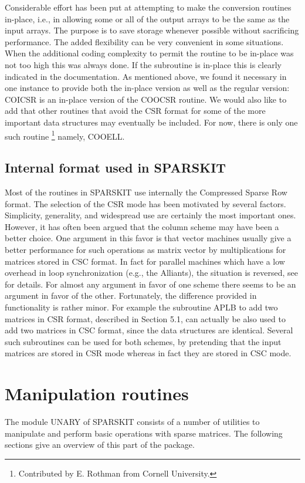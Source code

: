 \documentclass[12pt]{article}
\begin{document}
Considerable effort has been put at attempting to make the conversion
routines in-place, i.e., in allowing some or all of 
the output arrays to be the same as the input arrays. 
The purpose is to save storage whenever possible without
sacrificing performance. The added flexibility can be 
very convenient in some situations. 
When the additional coding complexity to  permit
the routine to be in-place was not too high this was always done.
If the subroutine is in-place this is clearly indicated in the
documentation. As mentioned above, we found it necessary in one instance
to provide both the in-place version as well as the regular version:
 COICSR is an in-place version of the COOCSR routine.
We would also like to add that other routines that avoid the
CSR format for some of the more important data structures may
eventually be included. For now, there is only one such routine
\footnote{Contributed by E. Rothman from Cornell University.}
namely, COOELL. 

\subsection{Internal format used in SPARSKIT}
Most of the routines in SPARSKIT  use internally the Compressed
Sparse Row format. The selection of 
the CSR mode has been motivated by several factors. Simplicity,
generality, and widespread use are certainly the most 
important ones. However, it has often been argued 
that the column scheme may
have been a better choice. One argument in this favor is that
vector machines usually give a better performance for such 
operations as matrix vector by multiplications for matrices
stored in CSC format. In fact for parallel machines which
have a low overhead in loop synchronization (e.g., the Alliants),
the situation is reversed, see \cite{Saad-Boeing} for details.
For almost any argument in favor of one scheme there seems
to be an argument in favor of the other. Fortunately,
the difference provided in functionality is rather minor.
For example the subroutine APLB to add two matrices in CSR format,
described in Section 5.1, can actually be also used to add 
two matrices in CSC format, since the data structures
are identical. Several such subroutines can be used for both
schemes, by pretending that the input matrices
are stored in CSR mode whereas in fact they are 
stored in CSC mode. 

\section{Manipulation routines} The module UNARY   
of SPARSKIT consists of a  number of  utilities to  manipulate and perform
basic operations with sparse matrices. The  following sections 
give an overview of this part of the package.
\end{document}
